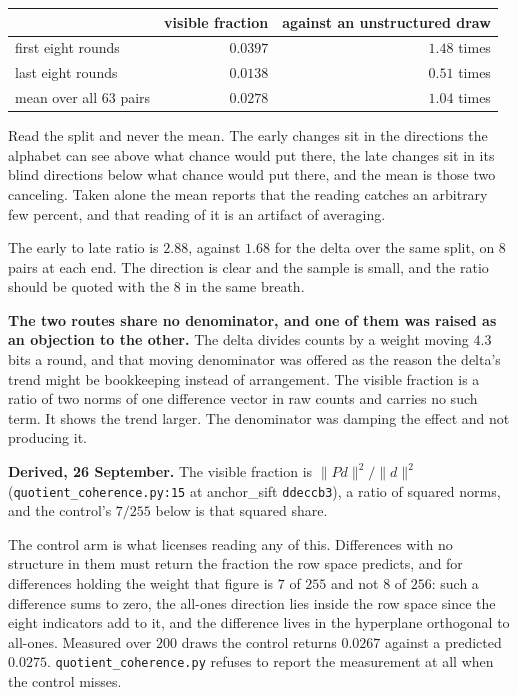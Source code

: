 \begin{center}
\begin{tabular}{@{}lrr@{}}
\toprule
 & visible fraction & against an unstructured draw \\
\midrule
first eight rounds & \(0.0397\) & \(1.48\) times \\
last eight rounds & \(0.0138\) & \(0.51\) times \\
mean over all 63 pairs & \(0.0278\) & \(1.04\) times \\
\bottomrule
\end{tabular}
\end{center}

Read the split and never the mean. The early changes sit in the directions the alphabet can see above what chance would put there, the late changes sit in its blind directions below what chance would put there, and the mean is those two canceling. Taken alone the mean reports that the reading catches an arbitrary few percent, and that reading of it is an artifact of averaging.

The early to late ratio is \(2.88\), against \(1.68\) for the delta over the same split, on \(8\) pairs at each end. The direction is clear and the sample is small, and the ratio should be quoted with the \(8\) in the same breath.

\textbf{The two routes share no denominator, and one of them was raised as an objection to the other.} The delta divides counts by a weight moving \(4.3\) bits a round, and that moving denominator was offered as the reason the delta's trend might be bookkeeping instead of arrangement. The visible fraction is a ratio of two norms of one difference vector in raw counts and carries no such term. It shows the trend larger. The denominator was damping the effect and not producing it.

\textbf{Derived, 26 September.} The visible fraction is \(\| P d \|^2 / \| d \|^2\) (\texttt{quotient\_coherence.py:15} at anchor\_sift \texttt{ddeccb3}), a ratio of squared norms, and the control's \(7/255\) below is that squared share.

The control arm is what licenses reading any of this. Differences with no structure in them must return the fraction the row space predicts, and for differences holding the weight that figure is \(7\) of \(255\) and not \(8\) of \(256\): such a difference sums to zero, the all-ones direction lies inside the row space since the eight indicators add to it, and the difference lives in the hyperplane orthogonal to all-ones. Measured over \(200\) draws the control returns \(0.0267\) against a predicted \(0.0275\). \texttt{quotient\_coherence.py} refuses to report the measurement at all when the control misses.

